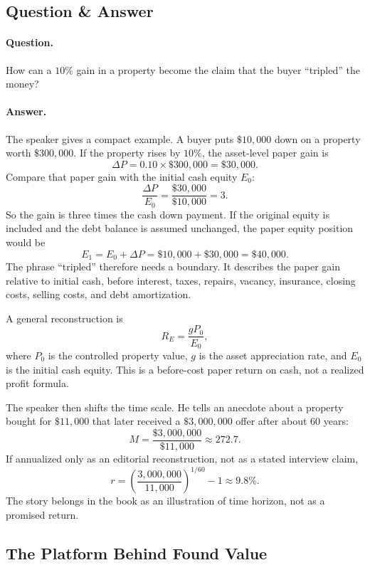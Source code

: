 \documentclass[11pt,oneside]{book}
\begin{document}
\subsection{Question \& Answer}

\paragraph{Question.}
How can a \(10\%\) gain in a property become the claim that the buyer ``tripled'' the money?

\paragraph{Answer.}
The speaker gives a compact example. A buyer puts \(\$10{,}000\) down on a property worth \(\$300{,}000\). If the property rises by \(10\%\), the asset-level paper gain is
\[
\Delta P
=
0.10\times \$300{,}000
=
\$30{,}000.
\]
Compare that paper gain with the initial cash equity \(E_0\):
\[
\frac{\Delta P}{E_0}
=
\frac{\$30{,}000}{\$10{,}000}
=
3.
\]
So the gain is three times the cash down payment. If the original equity is included and the debt balance is assumed unchanged, the paper equity position would be
\[
E_1=E_0+\Delta P=\$10{,}000+\$30{,}000=\$40{,}000.
\]
The phrase ``tripled'' therefore needs a boundary. It describes the paper gain relative to initial cash, before interest, taxes, repairs, vacancy, insurance, closing costs, selling costs, and debt amortization.

A general reconstruction is
\[
R_E=\frac{gP_0}{E_0},
\]
where \(P_0\) is the controlled property value, \(g\) is the asset appreciation rate, and \(E_0\) is the initial cash equity. This is a before-cost paper return on cash, not a realized profit formula.

The speaker then shifts the time scale. He tells an anecdote about a property bought for \(\$11{,}000\) that later received a \(\$3{,}000{,}000\) offer after about \(60\) years:
\[
M=\frac{\$3{,}000{,}000}{\$11{,}000}\approx 272.7.
\]
If annualized only as an editorial reconstruction, not as a stated interview claim,
\[
r=
\left(\frac{3{,}000{,}000}{11{,}000}\right)^{1/60}-1
\approx 9.8\%.
\]
The story belongs in the book as an illustration of time horizon, not as a promised return.

\subsection{The Platform Behind Found Value}
\end{document}

